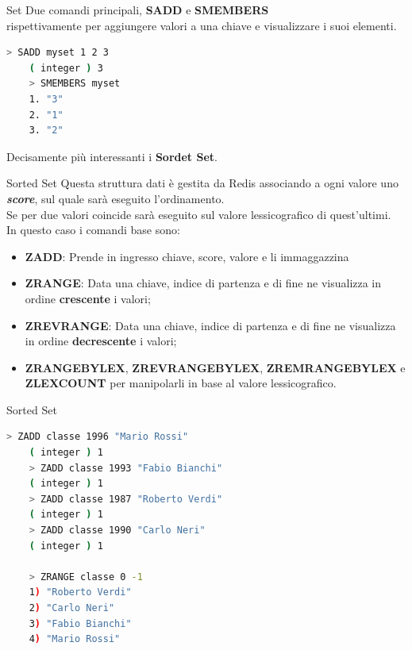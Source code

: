 \documentclass[xcolor=dvipsnames]{beamer}
\begin{document}
\begin{frame}[fragile]{Set}
  Due comandi principali, \textbf{SADD} e \textbf{SMEMBERS} \\
  rispettivamente per aggiungere valori a una chiave e visualizzare i suoi elementi.
  \begin{lstlisting}[language=bash]
    > SADD myset 1 2 3
    ( integer ) 3
    > SMEMBERS myset
    1. "3"
    2. "1"
    3. "2"
  \end{lstlisting}

  Decisamente più interessanti i \textbf{Sordet Set}.


\end{frame}

\begin{frame}[fragile]{Sorted Set}
  Questa struttura dati è gestita da Redis associando a ogni valore uno \textbf{\textit{score}}, sul quale sarà eseguito l'ordinamento.
  \\
  Se per due valori coincide sarà eseguito sul valore lessicografico di quest'ultimi.
  \\
  In questo caso i comandi base sono:
  \begin{itemize}
    \item \textbf{ZADD}: Prende in ingresso chiave, score, valore e li immaggazzina
    \item \textbf{ZRANGE}: Data una chiave, indice di partenza e di fine ne visualizza in ordine \textbf{crescente} i valori;
    \item \textbf{ZREVRANGE}: Data una chiave, indice di partenza e di fine ne visualizza in ordine \textbf{decrescente} i valori;
    \item \textbf{ZRANGEBYLEX}, \textbf{ZREVRANGEBYLEX}, \textbf{ZREMRANGEBYLEX} e \textbf{ZLEXCOUNT} per manipolarli in base al valore lessicografico.
  \end{itemize}

\end{frame}

\begin{frame}[fragile]{Sorted Set}
  \begin{lstlisting}[language=bash]
    > ZADD classe 1996 "Mario Rossi"
    ( integer ) 1
    > ZADD classe 1993 "Fabio Bianchi"
    ( integer ) 1
    > ZADD classe 1987 "Roberto Verdi"
    ( integer ) 1
    > ZADD classe 1990 "Carlo Neri"
    ( integer ) 1

    > ZRANGE classe 0 -1
    1) "Roberto Verdi"
    2) "Carlo Neri"
    3) "Fabio Bianchi"
    4) "Mario Rossi"
  \end{lstlisting}
\end{frame}
\end{document}
